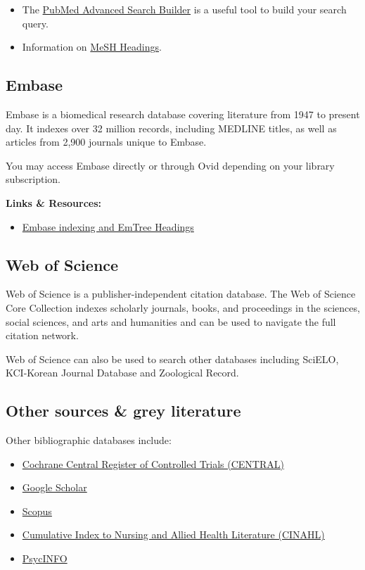 \documentclass[
]{book}
\providecommand{\tightlist}{%
  \setlength{\itemsep}{0pt}\setlength{\parskip}{0pt}}
\begin{document}
\begin{itemize}
\item
  The \href{https://www.ncbi.nlm.nih.gov/pubmed/advanced}{PubMed Advanced Search Builder} is a useful tool to build your search query.
\item
  Information on \href{https://www.nlm.nih.gov/mesh/meshhome.html}{MeSH Headings}.
\end{itemize}

\subsection{Embase}\label{embase}

Embase is a biomedical research database covering literature from 1947 to present day. It indexes over 32 million records, including MEDLINE titles, as well as articles from 2,900 journals unique to Embase.

You may access Embase directly or through Ovid depending on your library subscription.

\textbf{Links \& Resources:}

\begin{itemize}
\tightlist
\item
  \href{https://www.elsevier.com/solutions/embase-biomedical-research/embase-coverage-and-content}{Embase indexing and EmTree Headings}
\end{itemize}

\subsection{Web of Science}\label{web-of-science}

Web of Science is a publisher-independent citation database. The Web of Science Core Collection indexes scholarly journals, books, and proceedings in the sciences, social sciences, and arts and humanities and can be used to navigate the full citation network.

Web of Science can also be used to search other databases including SciELO, KCI-Korean Journal Database and Zoological Record.

\subsection{Other sources \& grey literature}\label{other-sources-grey-literature}

Other bibliographic databases include:

\begin{itemize}
\tightlist
\item
  \href{https://www.cochranelibrary.com/central/about-central}{Cochrane Central Register of Controlled Trials (CENTRAL)}
\item
  \href{https://scholar.google.com/}{Google Scholar}
\item
  \href{https://www.scopus.com/home.uri}{Scopus}
\item
  \href{https://www.ebscohost.com/nursing/products/cinahl-databases/cinahl-complete}{Cumulative Index to Nursing and Allied Health Literature (CINAHL)}
\item
  \href{https://www.apa.org/pubs/databases/psycinfo}{PsycINFO}
\end{itemize}
\end{document}
